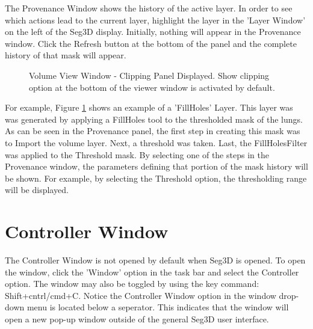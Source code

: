 \documentclass[fleqn,11pt,openany]{book}
\begin{document}
The Provenance Window shows the history of the active layer.  
In order to see which actions lead to the current layer, highlight the layer in the 'Layer Window' on the left of the Seg3D display.
Initially, nothing will appear in the Provenance window.
Click the Refresh button at the bottom of the panel and the complete history of that mask will appear.

\begin{figure}[b!]
\caption{Volume View Window - Clipping Panel Displayed. Show clipping option at the bottom of the viewer window is activated by default.}\label{fig:ProvenanceWindow}
\end{figure}

For example, Figure \ref{fig:ProvenanceWindow} shows an example of a 'FillHoles' Layer.
This layer was was generated by applying a FillHoles tool to the thresholded mask of the lungs.
As can be seen in the Provenance panel, the first step in creating this mask was to Import the volume layer.  
Next, a threshold was taken.  Last, the FillHolesFilter was applied to the Threshold mask.
By selecting one of the steps in the Provenance window, the parameters defining that portion of the mask history will be shown.
For example, by selecting the Threshold option, the thresholding range will be displayed.

\section{Controller Window}
The Controller Window is not opened by default when Seg3D is opened.  To open the window, click the 'Window' option in the task bar and select the Controller option.  The window may also be toggled by using the key command: Shift+cntrl/cmd+C.
Notice the Controller Window option in the window drop-down menu is located below a seperator.  
This indicates that the window will open a new pop-up window outside of the general Seg3D user interface.
\end{document}
